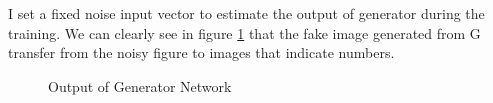 \documentclass{article} %
\begin{document}
I set a fixed noise input vector to estimate the output of generator during the training. We can clearly see in figure \ref{fig:Output} that the fake image generated from G transfer from the noisy figure to images that indicate numbers.

\begin{figure}[htbp]
\centering
{}%
%
\centering
\caption{Output of Generator Network}
\label{fig:Output}
\end{figure}
\end{document}
